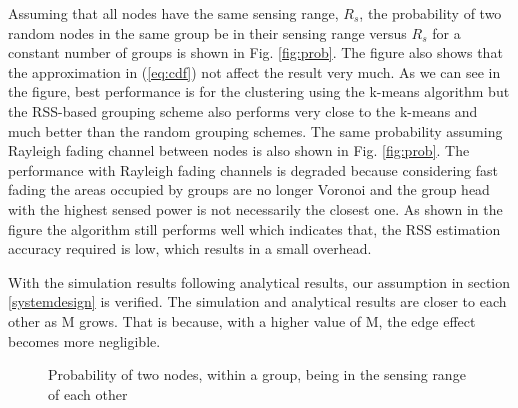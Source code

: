 Assuming that all nodes have the same sensing range, $R_s$, the probability of two random nodes in the same group be in their sensing range versus $R_s$ for a constant number of groups is shown in Fig. \ref{fig:prob}. The figure also shows that the approximation in (\ref{eq:cdf}) not affect the result very much. As we can see in the figure, best performance is for the clustering using the k-means algorithm but the RSS-based grouping scheme also performs very close to the k-means and much better than the random grouping schemes. The same probability assuming Rayleigh fading channel between nodes is also shown in Fig. \ref{fig:prob}. The performance with Rayleigh fading channels is degraded because considering fast fading the areas occupied by groups are no longer Voronoi and the group head with the highest sensed power is not necessarily the closest one. As shown in the figure the algorithm still performs well which indicates that, the RSS estimation accuracy required is low, which results in a small overhead.

With the simulation results following analytical results, our assumption in section \ref{systemdesign} is verified. The simulation and analytical results are closer to each other as M grows. That is because, with a higher value of M, the edge effect becomes more negligible.


\begin{figure}
  \centering
  \caption{Probability of two nodes, within a group, being in the sensing range of each other}
  \label{fig:probabilities}
\end{figure}


